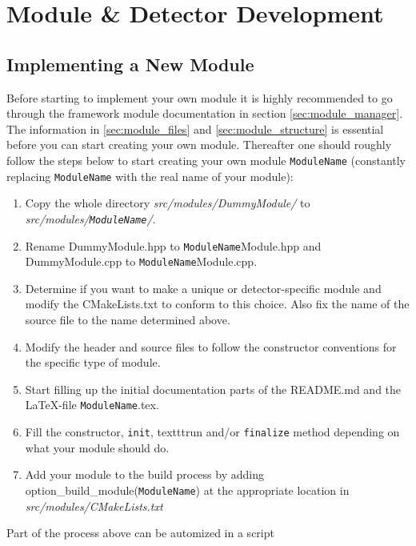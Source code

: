 \section{Module \& Detector Development}
\subsection{Implementing a New Module}
\label{sec:building_new_module}
Before starting to implement your own module it is highly recommended to go through the framework module documentation in section \ref{sec:module_manager}. The information in \ref{sec:module_files} and \ref{sec:module_structure} is essential before you can start creating your own module. Thereafter one should roughly follow the steps below to start creating your own module \texttt{ModuleName} (constantly replacing  \texttt{ModuleName} with the real name of your module):
\begin{enumerate}
\item Copy the whole directory \textit{src/modules/DummyModule/} to \textit{src/modules/\texttt{ModuleName}/}.
\item Rename DummyModule.hpp to \texttt{ModuleName}Module.hpp and DummyModule.cpp to \texttt{ModuleName}Module.cpp.
\item Determine if you want to make a unique or detector-specific module and modify the CMakeLists.txt to conform to this choice. Also fix the name of the source file to the name determined above.
\item Modify the header and source files to follow the constructor conventions for the specific type of module.
\item Start filling up the initial documentation parts of the README.md and the \LaTeX-file \texttt{ModuleName}.tex.
\item Fill the constructor, \texttt{init}, texttt{run} and/or \texttt{finalize} method depending on what your module should do.
\item Add your module to the build process by adding option\_build\_module(\texttt{ModuleName}) at the appropriate location in \textit{src/modules/CMakeLists.txt}
\end{enumerate}
\todo Part of the process above can be automized in a script \todo

